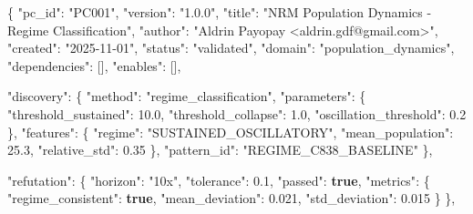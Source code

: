 \documentclass[
]{article}
\newenvironment{Shaded}{}{}
\newcommand{\DataTypeTok}[1]{\textcolor[rgb]{0.56,0.13,0.00}{#1}}
\newcommand{\FloatTok}[1]{\textcolor[rgb]{0.25,0.63,0.44}{#1}}
\newcommand{\FunctionTok}[1]{\textcolor[rgb]{0.02,0.16,0.49}{#1}}
\newcommand{\KeywordTok}[1]{\textcolor[rgb]{0.00,0.44,0.13}{\textbf{#1}}}
\newcommand{\OtherTok}[1]{\textcolor[rgb]{0.00,0.44,0.13}{#1}}
\newcommand{\StringTok}[1]{\textcolor[rgb]{0.25,0.44,0.63}{#1}}
\begin{document}
\begin{Shaded}
\begin{Highlighting}[]
\FunctionTok{\{}
  \DataTypeTok{"pc\_id"}\FunctionTok{:} \StringTok{"PC001"}\FunctionTok{,}
  \DataTypeTok{"version"}\FunctionTok{:} \StringTok{"1.0.0"}\FunctionTok{,}
  \DataTypeTok{"title"}\FunctionTok{:} \StringTok{"NRM Population Dynamics {-} Regime Classification"}\FunctionTok{,}
  \DataTypeTok{"author"}\FunctionTok{:} \StringTok{"Aldrin Payopay \textless{}aldrin.gdf@gmail.com\textgreater{}"}\FunctionTok{,}
  \DataTypeTok{"created"}\FunctionTok{:} \StringTok{"2025{-}11{-}01"}\FunctionTok{,}
  \DataTypeTok{"status"}\FunctionTok{:} \StringTok{"validated"}\FunctionTok{,}
  \DataTypeTok{"domain"}\FunctionTok{:} \StringTok{"population\_dynamics"}\FunctionTok{,}
  \DataTypeTok{"dependencies"}\FunctionTok{:} \OtherTok{[]}\FunctionTok{,}
  \DataTypeTok{"enables"}\FunctionTok{:} \OtherTok{[]}\FunctionTok{,}

  \DataTypeTok{"discovery"}\FunctionTok{:} \FunctionTok{\{}
    \DataTypeTok{"method"}\FunctionTok{:} \StringTok{"regime\_classification"}\FunctionTok{,}
    \DataTypeTok{"parameters"}\FunctionTok{:} \FunctionTok{\{}
      \DataTypeTok{"threshold\_sustained"}\FunctionTok{:} \FloatTok{10.0}\FunctionTok{,}
      \DataTypeTok{"threshold\_collapse"}\FunctionTok{:} \FloatTok{1.0}\FunctionTok{,}
      \DataTypeTok{"oscillation\_threshold"}\FunctionTok{:} \FloatTok{0.2}
    \FunctionTok{\},}
    \DataTypeTok{"features"}\FunctionTok{:} \FunctionTok{\{}
      \DataTypeTok{"regime"}\FunctionTok{:} \StringTok{"SUSTAINED\_OSCILLATORY"}\FunctionTok{,}
      \DataTypeTok{"mean\_population"}\FunctionTok{:} \FloatTok{25.3}\FunctionTok{,}
      \DataTypeTok{"relative\_std"}\FunctionTok{:} \FloatTok{0.35}
    \FunctionTok{\},}
    \DataTypeTok{"pattern\_id"}\FunctionTok{:} \StringTok{"REGIME\_C838\_BASELINE"}
  \FunctionTok{\},}

  \DataTypeTok{"refutation"}\FunctionTok{:} \FunctionTok{\{}
    \DataTypeTok{"horizon"}\FunctionTok{:} \StringTok{"10x"}\FunctionTok{,}
    \DataTypeTok{"tolerance"}\FunctionTok{:} \FloatTok{0.1}\FunctionTok{,}
    \DataTypeTok{"passed"}\FunctionTok{:} \KeywordTok{true}\FunctionTok{,}
    \DataTypeTok{"metrics"}\FunctionTok{:} \FunctionTok{\{}
      \DataTypeTok{"regime\_consistent"}\FunctionTok{:} \KeywordTok{true}\FunctionTok{,}
      \DataTypeTok{"mean\_deviation"}\FunctionTok{:} \FloatTok{0.021}\FunctionTok{,}
      \DataTypeTok{"std\_deviation"}\FunctionTok{:} \FloatTok{0.015}
    \FunctionTok{\}}
  \FunctionTok{\},}


\end{Highlighting}
\end{Shaded}
\end{document}
